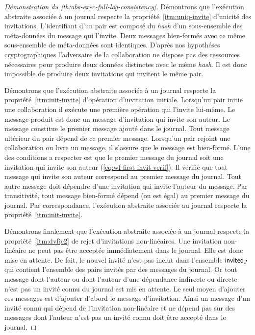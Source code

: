 \begin{proof}[Démonstration du \autoref{th:abs-exec-full-log-consistency}]
Démontrons que l'exécution abstraite associée à un journal  respecte la propriété~\ref{itm:uniq-invite} d'unicité des invitations.
L'identifiant d'un pair est composé du \emph{hash} d'un sous-ensemble des méta-données du message qui l'invite.
Deux messages bien-formés avec ce même sous-ensemble de méta-données sont identiques.
D'après nos hypothéses cryptographiques l'adversaire de la collaboration ne dispose pas des ressources nécessaires pour produire deux données distinctes avec le même \emph{hash}.
Il est donc impossible de produire deux invitations qui invitent le même pair.

Démontrons que l'exécution abstraite associée à un journal respecte la propriété~\ref{itm:init-invite} d'opération d'invitation initiale.
Lorsqu'un pair initie une collaboration il exécute une première opération qui l'invite lui-même.
Le message produit est donc un message d'invitation qui invite son auteur.
Le message constitue le premier message ajouté dans le journal.
Tout message ultérieur du pair dépend de ce premier message.
Lorsqu'un pair rejoint une collaboration ou livre un message, il s'assure que le message est bien-formé.
L'une des conditions a respecter est que le premier message du journal soit une invitation qui invite son auteur (\autoref{eq:wf-first-invit-verif}).
Il vérifie que tout message qui invite son auteur correspond au premier message du journal.
Tout autre message doit dépendre d'une invitation qui invite l'auteur du message.
Par transitivité, tout message bien-formé dépend (ou est égal) au premier message du journal.
Par correspondance, l'exécution abstraite associée au journal respecte la propriété~\ref{itm:init-invite}.

Démontrons finalement que l'exécution abstraite associée à un journal respecte la propriété~\ref{itm:dvfjc2} de rejet d'invitations non-linéaires.
Une invitation non-linéaire ne peut pas être acceptée immédiatement dans le journal.
Elle est donc mise en attente.
De fait, le nouvel invité n'est pas inclut dans l'ensemble $\operatorname{\mathsf{invited}}_J$ qui contient l'ensemble des pairs invités par des messages du journal.
Or tout message dont l'auteur ou dont l'auteur d'une dépendance indirecte ou directe n'est pas un invité connu du journal est mis en attente.
Le seul moyen d'ajouter ces messages est d'ajouter d'abord le message d'invitation.
Ainsi un message d'un invité connu qui dépend de l'invitation non-linéaire et ne dépend pas sur des messages dont l'auteur n'est pas un invité connu doit être accepté dans le journal.
\end{proof}


